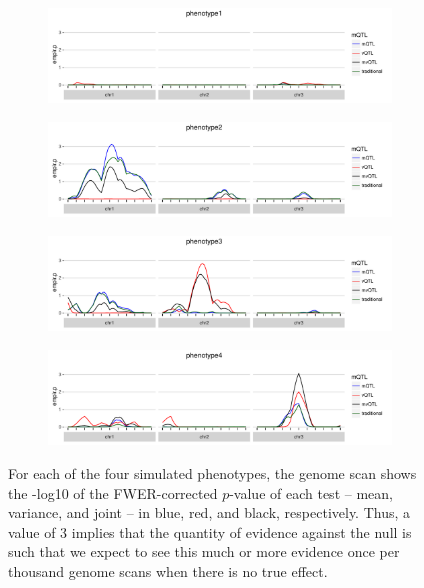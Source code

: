\documentclass[9pt,twocolumn,twoside]{gsag3jnl}
\begin{document}
\begin{figure}
    \begin{subfigure}{0.5\textwidth}
        \includegraphics[width=\textwidth]{images/empir_p_scan_phenotype1.pdf}
    \end{subfigure}

    \begin{subfigure}[b]{0.5\textwidth}
        \includegraphics[width=\textwidth]{images/empir_p_scan_phenotype2.pdf}
    \end{subfigure}

    \begin{subfigure}[b]{0.5\textwidth}
        \includegraphics[width=\textwidth]{images/empir_p_scan_phenotype3.pdf}
    \end{subfigure}
    
    \begin{subfigure}[b]{0.5\textwidth}
        \includegraphics[width=\textwidth]{images/empir_p_scan_phenotype4.pdf}
    \end{subfigure}
    
    \caption{For each of the four simulated phenotypes, the genome scan shows the -log10 of the FWER-corrected $p$-value of each test -- mean, variance, and joint -- in blue, red, and black, respectively. Thus, a value of 3 implies that the quantity of evidence against the null is such that we expect to see this much or more evidence once per thousand genome scans when there is no true effect. \label{fig:empir_p_scans}}
\end{figure}
\end{document}
